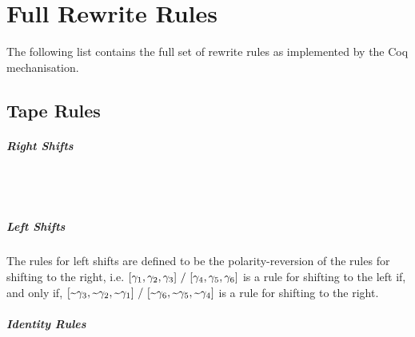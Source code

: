 \chapter{Full Rewrite Rules}\label{app:rewrite_rules}
The following list contains the full set of rewrite rules as implemented by the Coq mechanisation.

\section{Tape Rules}
\paragraph{Right Shifts}
\begin{center}
  \quad \trewwin{\blank}{\blank}{\blank}{\polpos{\blank}}{\polpos{\blank}}{\polpos{\blank}}
\\ 
  \quad {} {\polpos{\blank}}
\quad {}
 \\
  \quad {} {\polpos{\blank}}{\polpos{\blank}}{ } 
\quad {}
\end{center}

\paragraph{Left Shifts}
The rules for left shifts are defined to be the polarity-reversion of the rules for shifting to the right, i.e. $[\gamma_1, \gamma_2, \gamma_3]~/~[\gamma_4, \gamma_5, \gamma_6]$ is a rule for shifting to the left if, and only if, $[\text{\textasciitilde}\gamma_3, \text{\textasciitilde}\gamma_2, \text{\textasciitilde}\gamma_1]~/~[\text{\textasciitilde}\gamma_6, \text{\textasciitilde}\gamma_5, \text{\textasciitilde}\gamma_4]$ is a rule for shifting to the right. 

\paragraph{Identity Rules}
\begin{center}
  \\
  \trewwin{\#}{\blank}{\blank}{\#}{\blank}{\blank} 
  \quad \trewwin{\blank}{\blank}{\#}{\blank}{\blank}{\#}
\end{center}


